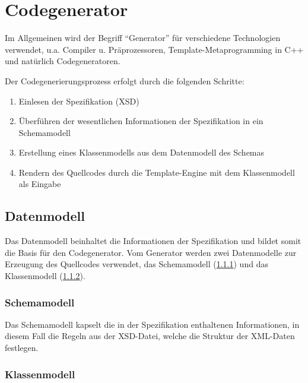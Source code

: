 \section{Codegenerator}

Im Allgemeinen wird der Begriff \enquote{Generator} für verschiedene Technologien verwendet, u.a. Compiler u. Präprozessoren, Template-Metaprogramming in C++ und natürlich Codegeneratoren.


Der Codegenerierungsprozess erfolgt durch die folgenden Schritte:

\begin{enumerate}
    \item Einlesen der Spezifikation (\gls{XSD})
    \item Überführen der wesentlichen Informationen der Spezifikation in ein Schemamodell
    \item Erstellung eines Klassenmodells aus dem Datenmodell des Schemas
    \item Rendern des Quellcodes durch die Template-Engine mit dem Klassenmodell als Eingabe
\end{enumerate}

\subsection{Datenmodell}

Das Datenmodell beinhaltet die Informationen der Spezifikation und bildet somit die Basis für den Codegenerator.
Vom Generator werden zwei Datenmodelle zur Erzeugung des Quellcodes verwendet, das Schemamodell (\cref{sec:schemamodel}) und das Klassenmodell (\cref{sec:classmodel}).

\subsubsection{Schemamodell}
\label{sec:schemamodel}

Das Schemamodell kapselt die in der Spezifikation enthaltenen Informationen, in diesem Fall die Regeln aus der \gls{XSD}-Datei, welche die Struktur der XML-Daten festlegen.

\subsubsection{Klassenmodell}
\label{sec:classmodel}

